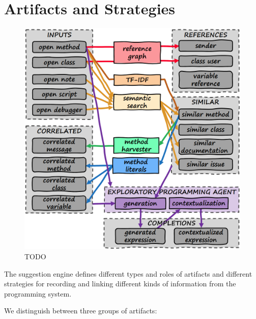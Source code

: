 
\section{Artifacts and Strategies}
\label{sec:suggestions/overview}

\begin{figure}
	\centering
	\includegraphics[width=\textwidth]{01_overview/graph.png}
	\caption[TODO]{
		TODO
	}
	\label{fig:suggestions/overview/graph}
\end{figure}

The suggestion engine defines different types and roles of artifacts and different strategies for recording and linking different kinds of information from the programming system.

We distinguish between three groups of artifacts:

